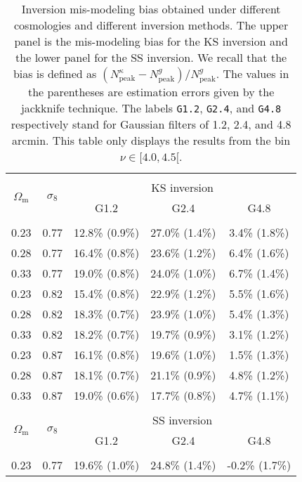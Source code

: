 \documentclass{aa} %
\newcommand{\OmegaM}{\Omega_\mathrm{m}}
\newcommand{\sigEig}{\sigma_8}
\newcommand{\peak}{\mathrm{peak}}
\begin{document}
\begin{table}[tb]
        \centering
        \caption{Inversion mis-modeling bias obtained under different cosmologies and different inversion methods. The upper panel is the mis-modeling bias for the KS inversion and the lower panel for the SS inversion. We recall that the bias is defined as $(N_\peak^\kappa - N_\peak^g) / N_\peak^g$. The values in the parentheses are estimation errors given by the jackknife technique. The labels \texttt{G1.2}, \texttt{G2.4}, and \texttt{G4.8} respectively stand for Gaussian filters of 1.2, 2.4, and 4.8 arcmin. This table only displays the results from the bin $\nu\in[4.0, 4.5[$.}
    \begin{tabular}{cc|ccc}
        \hline\hline\\[-2.0ex]
        \multirow{2}{*}{$\OmegaM$} & \multirow{2}{*}{$\sigEig$} & \multicolumn{3}{c}{KS inversion} \\
        & & G1.2 & G2.4 & G4.8\\
        \hline\\[-2.0ex]
        0.23 & 0.77 &  12.8\%  (0.9\%) &  27.0\%  (1.4\%) &   3.4\%  (1.8\%) \\
        0.28 & 0.77 &  16.4\%  (0.8\%) &  23.6\%  (1.2\%) &   6.4\%  (1.6\%) \\
        0.33 & 0.77 &  19.0\%  (0.8\%) &  24.0\%  (1.0\%) &   6.7\%  (1.4\%) \\
        0.23 & 0.82 &  15.4\%  (0.8\%) &  22.9\%  (1.2\%) &   5.5\%  (1.6\%) \\
        0.28 & 0.82 &  18.3\%  (0.7\%) &  23.9\%  (1.0\%) &   5.4\%  (1.3\%) \\
        0.33 & 0.82 &  18.2\%  (0.7\%) &  19.7\%  (0.9\%) &   3.1\%  (1.2\%) \\
        0.23 & 0.87 &  16.1\%  (0.8\%) &  19.6\%  (1.0\%) &   1.5\%  (1.3\%) \\
        0.28 & 0.87 &  18.1\%  (0.7\%) &  21.1\%  (0.9\%) &   4.8\%  (1.2\%) \\
        0.33 & 0.87 &  19.0\%  (0.6\%) &  17.7\%  (0.8\%) &   4.7\%  (1.1\%) \\
        \hline\\[-2.0ex]
        \multirow{2}{*}{$\OmegaM$} & \multirow{2}{*}{$\sigEig$} & \multicolumn{3}{c}{SS inversion} \\
        & & G1.2 & G2.4 & G4.8\\
        \hline\\[-2.0ex]
        0.23 & 0.77 &  19.6\%  (1.0\%) &  24.8\%  (1.4\%) &  -0.2\%  (1.7\%) \\

\end{tabular}
\end{table}
\end{document}
